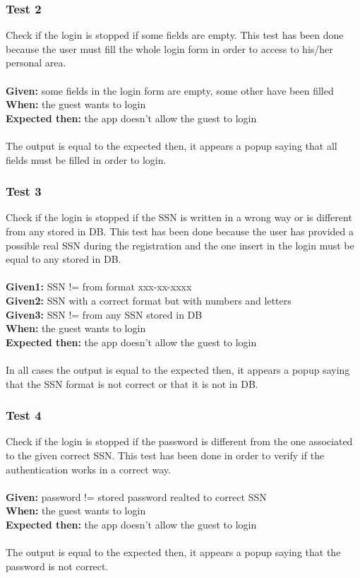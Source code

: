 \subsubsection{\Large{Test 2}}
Check if the login is stopped if some fields are empty. This test has been done because the user must fill the whole login form in order to access to his/her personal area.\\
\\
\textbf{Given: } some fields in the login form are empty, some other have been filled\\
\textbf{When: } the guest wants to login\\
\textbf{Expected then: } the app doesn't allow the guest to login\\
\\
The output is equal to the expected then, it appears a popup saying that all fields must be filled in order to login. 

\subsubsection{\Large{Test 3}}
Check if the login is stopped if the SSN is written in a wrong way or is different from any stored in DB. This test has been done because the user has provided a possible real SSN during the registration and the one insert in the login must be equal to any stored in DB.\\
\\
\textbf{Given1: } SSN != from format xxx-xx-xxxx \\
\textbf{Given2: } SSN with a correct format but with numbers and letters\\
\textbf{Given3: } SSN != from any SSN stored in DB\\
\textbf{When: } the guest wants to login\\
\textbf{Expected then: } the app doesn't allow the guest to login\\
\\
In all cases the output is equal to the expected then, it appears a popup saying that the SSN format is not correct or that it is not in DB.

\subsubsection{\Large{Test 4}}
Check if the login is stopped if the password is different from the one associated to the given correct SSN. This test has been done in order to verify if the authentication works in a correct way.\\
\\
\textbf{Given: } password != stored password realted to correct SSN\\
\textbf{When: } the guest wants to login\\
\textbf{Expected then: } the app doesn't allow the guest to login\\
\\
The output is equal to the expected then, it appears a popup saying that the password is not correct.

